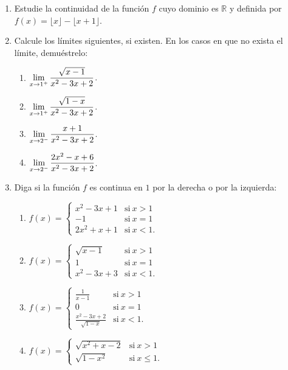 \begin{multicols}{2}
\begin{enumerate}[leftmargin=*]
\item Estudie la continuidad de la función $f$ cuyo dominio es $\mathbb{R}$ y definida por
    $f(x) = \lfloor x \rfloor - \lfloor x + 1 \rfloor$.

\item Calcule los límites siguientes, si existen. En los casos en que no exista el límite,
    demuéstrelo:
    \begin{enumerate}
    \item $\displaystyle{\limjc{\frac{\sqrt{x - 1}}{x^2 - 3x + 2}}{x}{1^+}}$.
    \item $\displaystyle{\limjc{\frac{\sqrt{1 - x}}{x^2 - 3x + 2}}{x}{1^+}}$.
    \item $\displaystyle{\limjc{\frac{x+1}{x^2 - 3x + 2}}{x}{2^-}}$.
    \item $\displaystyle{\limjc{\frac{2x^2 - x + 6}{x^2 - 3x + 2}}{x}{2^-}}$.
    \end{enumerate}

\item Diga si la función $f$ es continua en $1$ por la derecha o por la izquierda:
\begin{enumerate}
\item $\displaystyle{f(x) = \begin{cases} x^2 - 3x + 1 & \text{si} \ x > 1 \\
-1 & \text{si} \ x = 1 \\
2x^2 + x + 1 & \text{si} \ x < 1.
\end{cases}}$

\item $\displaystyle{f(x) = \begin{cases} \sqrt{x - 1} & \text{si} \ x > 1 \\
1 & \text{si} \ x = 1 \\
x^2 - 3x + 3 & \text{si} \ x < 1.
\end{cases}}$

\item $\displaystyle{f(x) = \begin{cases} \frac{1}{x - 1} & \text{si} \ x > 1 \\
0 & \text{si} \ x = 1 \\
\frac{x^2 - 3x + 2}{\sqrt{1 - x}} & \text{si} \ x < 1.
\end{cases}}$

\item $\displaystyle{f(x) = \begin{cases} \sqrt{x^2 + x - 2} & \text{si} \ x > 1 \\
\sqrt{1 - x^2} & \text{si} \ x \leq 1.
\end{cases}}$


\end{enumerate}
\end{enumerate}
\end{multicols}
